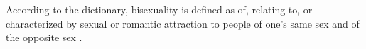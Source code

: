 According to the dictionary, bisexuality is defined as of, relating to, or 
characterized by sexual or romantic attraction to people of one's same sex and 
of the opposite sex \cite{bisexual-def}.
